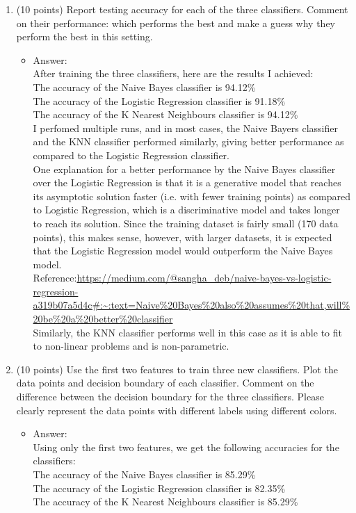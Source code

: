 \documentclass[twoside,10pt]{article}
\begin{document}
\begin{enumerate}
\begin{enumerate}
	\item (10 points) Report testing accuracy for each of the three classifiers.  Comment on their performance: which performs the best and make a guess why they perform the best in this setting. 
	
	\begin{itemize}
	\item Answer:\\
	After training the three classifiers, here are the results I achieved:\\
	The accuracy of the Naive Bayes classifier is 94.12\%\\
	The accuracy of the Logistic Regression classifier is 91.18\%\\
	The accuracy of the K Nearest Neighbours classifier is 94.12\%\\
	 I perfomed multiple runs, and in most cases, the Naive Bayers classifier and the KNN classifier performed similarly, giving better performance as compared to the Logistic Regression classifier.\\
	 
	 One explanation for a better performance by the Naive Bayes classifier over the Logistic Regression is that it is a generative model that reaches its asymptotic solution faster (i.e. with fewer training points) as compared to Logistic Regression, which is a discriminative model and takes longer to reach its solution. Since the training dataset is fairly small (170 data points), this makes sense, however, with larger datasets, it is expected that the Logistic Regression model would outperform the Naive Bayes model.\\
	 
	 Reference:\url{https://medium.com/@sangha_deb/naive-bayes-vs-logistic-regression-a319b07a5d4c#:~:text=Naive%20Bayes%20also%20assumes%20that,will%20be%20a%20better%20classifier}\\
	 
	 Similarly, the KNN classifier performs well in this case as it is able to fit to non-linear problems and is non-parametric.
	\end{itemize}
	\item (10 points) Use the first two features to train three new classifiers. Plot the data points and decision boundary of each classifier. Comment on the difference between the decision boundary for the three classifiers. Please clearly represent the data points with different labels using different colors.
	\begin{itemize}
	\item Answer:\\
	Using only the first two features, we get the following accuracies for the classifiers:\\
	The accuracy of the Naive Bayes classifier is 85.29\%\\
	The accuracy of the Logistic Regression classifier is 82.35\%\\
	The accuracy of the K Nearest Neighbours classifier is 85.29\%\\
	

\end{itemize}
\end{enumerate}
\end{enumerate}
\end{document}
